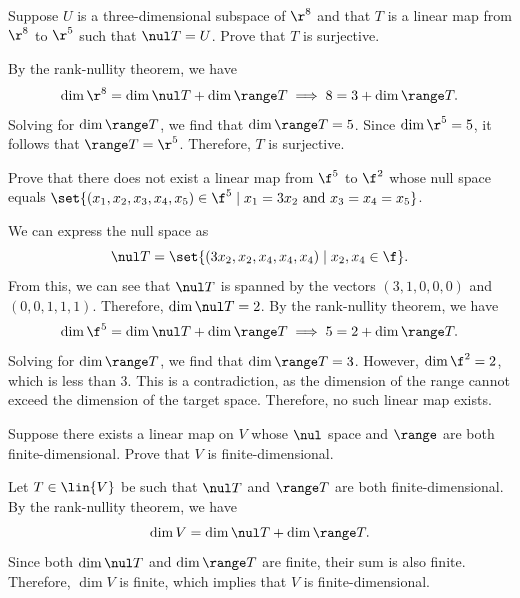 \begin{exercise}[3b13]
    Suppose $U$ is a three-dimensional subspace of $\r^8$ and that $T$ is a linear map from $\r^8$ to $\r^5$ such that $\nul T = U$. Prove that $T$ is surjective.
\end{exercise}

\begin{sol}
    By the rank-nullity theorem, we have
    \[\dim \r^8 = \dim \nul T + \dim \range T \implies 8 = 3 + \dim \range T.\]
    Solving for $\dim \range T$, we find that $\dim \range T = 5$. Since $\dim \r^5 = 5$, it follows that $\range T = \r^5$. Therefore, $T$ is surjective.
\end{sol}

\begin{exercise}[3b14]
    Prove that there does not exist a linear map from $\f^5$ to $\f^2$ whose null space equals $\set{(x_1, x_2, x_3, x_4, x_5) \in \f^5 \mid x_1 = 3x_2 \text{ and } x_3 = x_4 = x_5}$.
\end{exercise}

\begin{sol}
    We can express the null space as
    \[\nul T = \set{(3x_2, x_2, x_4, x_4, x_4) \mid x_2, x_4 \in \f}.\]
    From this, we can see that $\nul T$ is spanned by the vectors $(3, 1, 0, 0, 0)$ and $(0, 0, 1, 1, 1)$. Therefore, $\dim \nul T = 2$. By the rank-nullity theorem, we have
    \[\dim \f^5 = \dim \nul T + \dim \range T \implies 5 = 2 + \dim \range T.\]
    Solving for $\dim \range T$, we find that $\dim \range T = 3$. However, $\dim \f^2 = 2$, which is less than $3$. This is a contradiction, as the dimension of the range cannot exceed the dimension of the target space. Therefore, no such linear map exists.
\end{sol}

\begin{exercise}[3b15]
    Suppose there exists a linear map on $V$ whose $\nul$ space and $\range$ are both finite-dimensional. Prove that $V$ is finite-dimensional.
\end{exercise}

\begin{sol}
    Let $T \in \lin{V}$ be such that $\nul T$ and $\range T$ are both finite-dimensional. By the rank-nullity theorem, we have
    \[\dim V = \dim \nul T + \dim \range T.\]
    Since both $\dim \nul T$ and $\dim \range T$ are finite, their sum is also finite. Therefore, $\dim V$ is finite, which implies that $V$ is finite-dimensional.
\end{sol}

